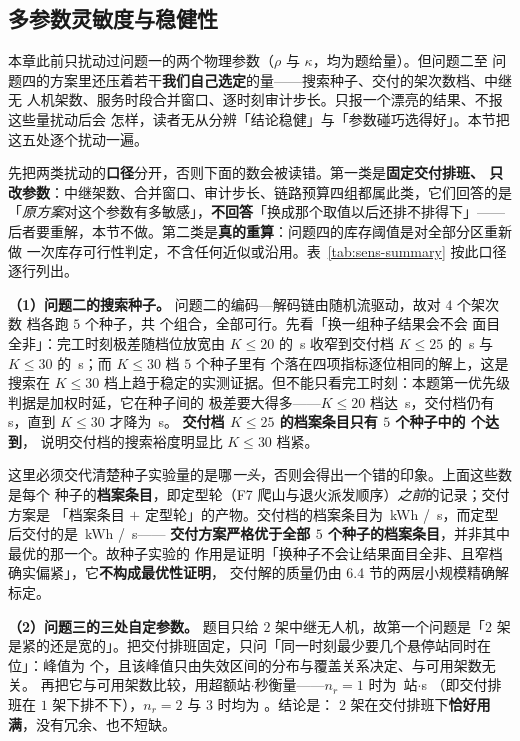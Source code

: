 \subsection{多参数灵敏度与稳健性}
\label{sec:sens-thresh}
\label{sec:sens-seed}

本章此前只扰动过问题一的两个物理参数（$\rho$ 与 $\kappa$，均为题给量）。但问题二至
问题四的方案里还压着若干\textbf{我们自己选定}的量——搜索种子、交付的架次数档、中继无
人机架数、服务时段合并窗口、逐时刻审计步长。只报一个漂亮的结果、不报这些量扰动后会
怎样，读者无从分辨「结论稳健」与「参数碰巧选得好」。本节把这五处逐个扰动一遍。

先把两类扰动的\textbf{口径}分开，否则下面的数会被读错。第一类是\textbf{固定交付排班、
只改参数}：中继架数、合并窗口、审计步长、链路预算四组都属此类，它们回答的是
「\emph{原方案}对这个参数有多敏感」，\textbf{不回答}「换成那个取值以后还排不排得下」——
后者要重解，本节不做。第二类是\textbf{真的重算}：问题四的库存阈值是对全部分区重新做
一次库存可行性判定，不含任何近似或沿用。表~\ref{tab:sens-summary} 按此口径逐行列出。

\textbf{（1）问题二的搜索种子。} 问题二的编码—解码链由随机流驱动，故对 $4$ 个架次数
档各跑 $5$ 个种子，共 \mtQtwoSeedRuns 个组合，全部可行。先看「换一组种子结果会不会
面目全非」：完工时刻极差随档位放宽由 $K\le20$ 的 \mtQtwoSeedSpreadKTwenty\,s 收窄到交付档
$K\le25$ 的 \mtQtwoSeedSpreadKTwentyFive\,s 与 $K\le30$ 的 \mtQtwoSeedSpreadKThirty\,s；而 $K\le30$
档 $5$ 个种子里有 \mtQtwoSeedSameKThirty 个落在四项指标逐位相同的解上，这是搜索在
$K\le30$ 档上趋于稳定的实测证据。但不能只看完工时刻：本题第一优先级判据是加权时延，它在种子间的
极差要大得多——$K\le20$ 档达 \mtQtwoSeedTardSpreadKTwenty\,s，交付档仍有
\mtQtwoSeedTardSpreadKTwentyFive\,s，直到 $K\le30$ 才降为 \mtQtwoSeedTardSpreadKThirty\,s。
\textbf{交付档 $K\le25$ 的档案条目只有 $5$ 个种子中的 \mtQtwoSeedZeroTardKTwentyFive 个达到}，
说明交付档的搜索裕度明显比 $K\le30$ 档紧。

这里必须交代清楚种子实验量的是哪\emph{一头}，否则会得出一个错的印象。上面这些数是每个
种子的\textbf{档案条目}，即定型轮（F7 爬山与退火派发顺序）\emph{之前}的记录；交付方案是
「档案条目 $+$ 定型轮」的产物。交付档的档案条目为 \mtQtwoArchKTwentyFiveEn\,kWh /
\mtQtwoArchKTwentyFiveMk\,s，而定型后交付的是 \mtQtwoEnergy\,kWh / \mtQtwoMakespan\,s——
\textbf{交付方案严格优于全部 $5$ 个种子的档案条目}，并非其中最优的那一个。故种子实验的
作用是证明「换种子不会让结果面目全非、且窄档确实偏紧」，它\textbf{不构成最优性证明}，
交付解的质量仍由 6.4 节的两层小规模精确解标定。

\textbf{（2）问题三的三处自定参数。}\label{sec:sens-q3param} 题目只给 $2$ 架中继无人机，故第一个问题是「$2$ 架
是紧的还是宽的」。把交付排班固定，只问「同一时刻最少要几个悬停站同时在位」：峰值为
\mtQthreePeakStations 个，且该峰值只由失效区间的分布与覆盖关系决定、与可用架数无关。
再把它与可用架数比较，用超额站$\cdot$秒衡量——$n_r=1$ 时为 \mtQthreeExcessROne\,站$\cdot$s
（即交付排班在 $1$ 架下排不下），$n_r=2$ 与 $3$ 时均为 \mtQthreeExcessRTwo。结论是：
$2$ 架在交付排班下\textbf{恰好用满}，没有冗余、也不短缺。

